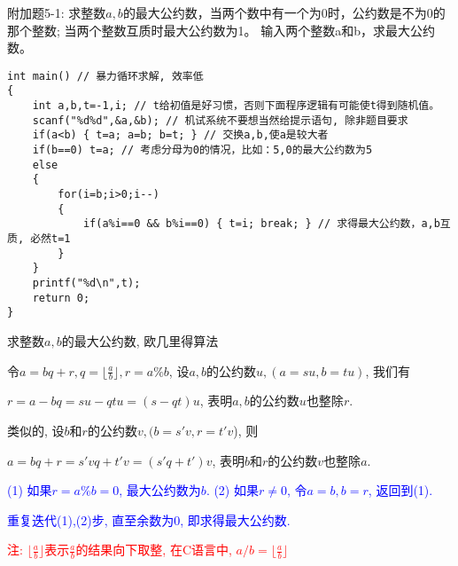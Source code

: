 \begin{frame}
附加题5-1: 求整数$a,b$的最大公约数，当两个数中有一个为0时，公约数是不为0的那个整数; 当两个整数互质时最大公约数为1。
输入两个整数a和b，求最大公约数。 
\pause
\begin{lstlisting}
int main() // 暴力循环求解, 效率低
{
	int a,b,t=-1,i; // t给初值是好习惯，否则下面程序逻辑有可能使t得到随机值。 
	scanf("%d%d",&a,&b); // 机试系统不要想当然给提示语句, 除非题目要求  
	if(a<b) { t=a; a=b; b=t; } // 交换a,b,使a是较大者 
	if(b==0) t=a; // 考虑分母为0的情况，比如：5,0的最大公约数为5 
	else
	{
		for(i=b;i>0;i--)
		{
			if(a%i==0 && b%i==0) { t=i; break; } // 求得最大公约数，a,b互质, 必然t=1 
		}
	}
	printf("%d\n",t);
	return 0;	
}
\end{lstlisting}
\end{frame}

\begin{frame}[fragile]{求整数$a,b$的最大公约数, 欧几里得算法}
\vspace{-0.3cm}

令$a=bq+r, q=\lfloor\frac{a}{b}\rfloor,r=a\%b$, 设$a,b$的公约数$u,(a=su, b=tu)$, 我们有

$r=a-bq=su-qtu=(s-qt)u$, 表明$a,b$的公约数$u$也整除$r$. 

类似的, 设$b$和$r$的公约数$v,(b=s'v, r=t'v$), 则

$a=bq+r=s'vq+t'v=(s'q+t')v$, 表明$b$和$r$的公约数$v$也整除$a$.

\medskip
\textcolor{blue}{(1) 如果$r=a\%b=0$, 最大公约数为$b$. (2) 如果$r\ne 0$, 令$a=b,b=r$, 返回到(1).}

\textcolor{blue}{重复迭代(1),(2)步, 直至余数为0, 即求得最大公约数.}

\small\textcolor{red}{注: $\lfloor\frac{a}{b}\rfloor$表示$\frac{a}{b}$的结果向下取整, 在C语言中, $a/b=\lfloor\frac{a}{b}\rfloor$}
\end{frame}

